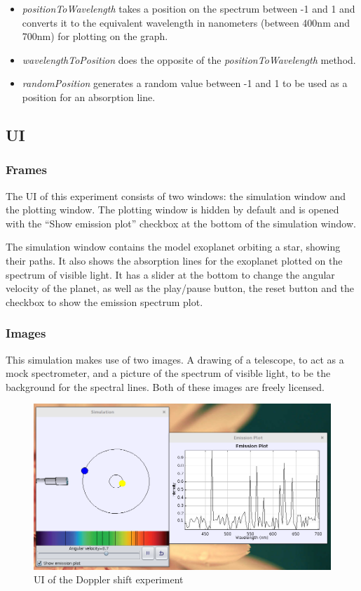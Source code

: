 \documentclass[11pt]{article}
\begin{document}
\begin{itemize}
\item \emph{positionToWavelength} takes a position on the spectrum between -1 and 1 and converts it to the equivalent wavelength in nanometers (between 400nm and 700nm) for plotting on the graph.
\item \emph{wavelengthToPosition} does the opposite of the \emph{positionToWavelength} method.
\item \emph{randomPosition} generates a random value between -1 and 1 to be used as a position for an absorption line.
\end{itemize}
\subsection*{UI}
\label{sec-3-6}
\subsubsection*{Frames}
\label{sec-3-6-1}

The UI of this experiment consists of two windows: the simulation
window and the plotting window. The plotting window is hidden by
default and is opened with the ``Show emission plot'' checkbox at the
bottom of the simulation window.

The simulation window contains the model exoplanet orbiting a star,
showing their paths. It also shows the absorption lines for the
exoplanet plotted on the spectrum of visible light. It has a slider at
the bottom to change the angular velocity of the planet, as well as
the play/pause button, the reset button and the checkbox to show the
emission spectrum plot.
\subsubsection*{Images}
\label{sec-3-6-2}

This simulation makes use of two images. A drawing of a telescope, to
act as a mock spectrometer, and a picture of the spectrum of visible
light, to be the background for the spectral lines. Both of these
images are freely licensed.

\begin{figure}[htb]
\centering
\includegraphics[width=.9\linewidth]{./dopplerUI.png}
\caption{UI of the Doppler shift experiment}
\end{figure}
\end{document}
